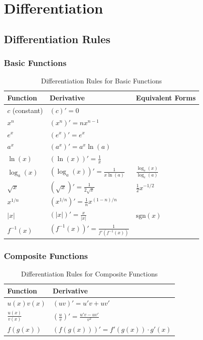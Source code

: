 \section{Differentiation}

\subsection{Differentiation Rules}
\subsubsection{Basic Functions}

\begin{table}[H]
\centering
\begin{tabular}{@{}lll@{}}
\toprule
Function & Derivative & Equivalent Forms \\
\midrule
$c$ (constant) & $(c)' = 0$ & \\
$x^n$ & $(x^n)' = nx^{n-1}$ & \\
$e^x$ & $(e^x)' = e^x$ & \\
$a^x$ & $(a^x)' = a^x \ln(a)$ & \\
$\ln(x)$ & $(\ln(x))' = \frac{1}{x}$ & \\
$\log_a(x)$ & $(\log_a(x))' = \frac{1}{x \ln(a)}$ & $\frac{\log_e(x)}{\log_e(a)}$ \\
$\sqrt{x}$ & $(\sqrt{x})' = \frac{1}{2\sqrt{x}}$ & $\frac{1}{2}x^{-1/2}$ \\
$x^{1/n}$ & $(x^{1/n})' = \frac{1}{n}x^{(1-n)/n}$ & \\
$|x|$ & $(|x|)' = \frac{x}{|x|}$ & $\text{sgn}(x)$ \\
$f^{-1}(x)$ & $(f^{-1}(x))' = \frac{1}{f'(f^{-1}(x))}$ & \\
\bottomrule
\end{tabular}
\caption{Differentiation Rules for Basic Functions}
\label{tab:basic_derivatives}
\end{table}

\subsubsection{Composite Functions}

\begin{table}[H]
\centering
\begin{tabular}{@{}ll@{}}
\toprule
Function & Derivative \\
\midrule
$u(x)v(x)$ & $(uv)' = u'v + uv'$ \\
$\frac{u(x)}{v(x)}$ & $(\frac{u}{v})' = \frac{u'v - uv'}{v^2}$ \\
$f(g(x))$ & $(f(g(x)))' = f'(g(x)) \cdot g'(x)$ \\
\bottomrule
\end{tabular}
\caption{Differentiation Rules for Composite Functions}
\label{tab:composite_derivatives}
\end{table}

